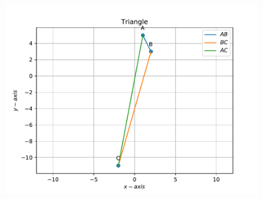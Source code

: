 \documentclass[12pt]{article}
\begin{document}
\begin{enumerate}
\begin{figure}[!h]
	\begin{center}
		\includegraphics[width=\columnwidth]{./figs/problem3.pdf}
	\end{center}
\caption{}
\label{fig:Fig1}
\end{figure}

\end{enumerate}
\end{document}
